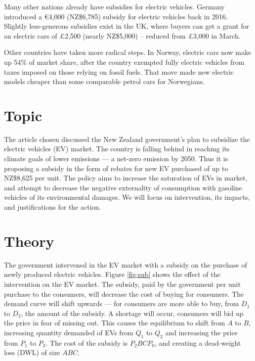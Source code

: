 \documentclass[a4paper,12pt]{article}
\begin{document}
Many other nations already have subsidies for electric vehicles. Germany introduced a €4,000 (NZ\$6,785) subsidy for electric vehicles back in 2016. Slightly less-generous subsidies exist in the UK, where buyers can get a grant for an electric cars of £2,500 (nearly NZ\$5,000) – reduced from £3,000 in March.

Other countries have taken more radical steps. In Norway, electric cars now make up 54\% of market share, after the country exempted fully electric vehicles from taxes imposed on those relying on fossil fuels. That move made new electric models cheaper than some comparable petrol cars for Norwegians.

\newpage

\section*{Topic}
The article chosen discussed the New Zealand government's plan to subsidize the electric vehicles (EV) market. The country is falling behind in reaching its climate goals of lower emissions --- a net-zero emission by 2050. Thus it is proposing a subsidy in the form of rebates for new EV purchased of up to NZ\$8,625 per unit. The policy aims to increase the saturation of EVs in market, and attempt to decrease the negative externality of consumption with gasoline vehicles of its environmental damages. We will focus on intervention, its impacts, and justifications for the action.


\section*{Theory}

The government intervened in the EV market with a subsidy on the purchase of newly produced electric vehicles. Figure \ref{fig:sub} shows the effect of the intervention on the EV market. The subsidy, paid by the government per unit purchase to the consumers, will decrease the cost of buying for consumers. The demand curve will shift upwards --- for consumers are more able to buy, from $D_1$ to $D_2$, the amount of the subsidy. A shortage will occur, consumers will bid up the price in fear of missing out. This causes the equilibrium to shift from $A$ to $B$, increasing quantity demanded of EVs from $Q_1$ to $Q_2$ and increasing the price from $P_1$ to $P_2$. The cost of the subsidy is $P_2BCP_0$, and creating a dead-weight loss (DWL) of size $ABC$.
\end{document}
